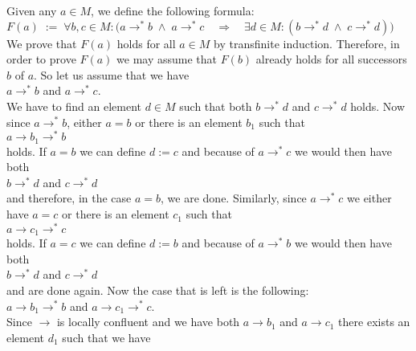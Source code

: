 \proof
Given any $a \in M$, we define the following formula:
\\[0.2cm]
\hspace*{1.3cm}
$F(a) \;:=\; \forall b, c \in M: \bigl(a \rightarrow^* b \;\wedge\; a \rightarrow^*c \quad\Rightarrow\quad
 \exists d \in M: (b \rightarrow^* d \;\wedge\; c \rightarrow^* d)\bigr)
$
\\[0.2cm]
We  prove that $F(a)$ holds for all $a \in M$ by transfinite induction.
Therefore, in order to prove $F(a)$ we may assume that $F(b)$ already holds for all successors $b$ of $a$.
So let us assume that we have
\\[0.2cm]
\hspace*{1.3cm}
$a \rightarrow^* b$ \quad and \quad $a \rightarrow^* c$.
\\[0.2cm]
We have to find an element $d \in M$ such that both $b \rightarrow^* d$ and $c \rightarrow^* d$ holds.
Now since $a \rightarrow^* b$, either $a = b$ or there is an element $b_1$ such that
\\[0.2cm]
\hspace*{1.3cm}
$a \rightarrow b_1 \rightarrow^* b$
\\[0.2cm]
holds.  If $a = b$ we can define $d := c$ and because of $a \rightarrow^* c$ we would then have both
\\[0.2cm]
\hspace*{1.3cm}
$b \rightarrow^* d$ \quad and \quad $c \rightarrow^* d$
\\[0.2cm]
and therefore, in the case $a = b$, we are done.  Similarly, since $a \rightarrow^* c$ we either have
$a = c$ or there is an element $c_1$ such that
\\[0.2cm]
\hspace*{1.3cm}
$a \rightarrow c_1 \rightarrow^* c$
\\[0.2cm]
holds.  If $a = c$ we can define $d := b$ and because of $a \rightarrow^* b$ we would then have both
\\[0.2cm]
\hspace*{1.3cm}
$b \rightarrow^* d$ \quad and \quad $c \rightarrow^* d$
\\[0.2cm]
and are done again.  Now the case that is left is the following:
\\[0.2cm]
\hspace*{1.3cm}
$a \rightarrow b_1 \rightarrow^* b$ \quad and \quad $a \rightarrow c_1 \rightarrow^* c$.
\\[0.2cm]
Since $\rightarrow$ is locally confluent and we have both $a \rightarrow b_1$ and  $a \rightarrow c_1$ 
there exists an element $d_1$ such that we have
